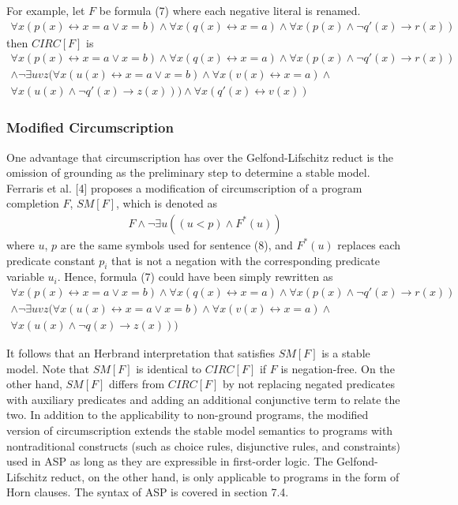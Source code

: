 For example, let $F$ be formula (7) where each negative literal is renamed.
\begin{align*}
    \forall x (p(x) \leftrightarrow x = a \lor x = b) \land 
    \forall x (q(x) \leftrightarrow x = a) \land 
    \forall x (p(x) \land \neg q'(x) \rightarrow r(x))
\end{align*}
then $CIRC[F]$ is 
\begin{multline*}
    \forall x (p(x) \leftrightarrow x = a \lor x = b) \land 
    \forall x (q(x) \leftrightarrow x = a) \land 
    \forall x (p(x) \land \neg q'(x) \rightarrow r(x)) \\ 
    \land \neg \exists uvz (
        \forall x (u(x) \leftrightarrow x = a \lor x = b) \land 
        \forall x (v(x) \leftrightarrow x = a) \land 
        \\ \forall x (u(x) \land \neg q'(x) \rightarrow z(x)) 
    ) 
    \land \forall x (q'(x) \leftrightarrow v(x))
\end{multline*}

\subsubsection{Modified Circumscription}
One advantage that circumscription has over the Gelfond-Lifschitz reduct 
is the omission of grounding as the preliminary step to determine a stable 
model. Ferraris et al. [4] proposes a modification of circumscription of 
a program completion $F$, $SM[F]$, which is denoted as 
\begin{align}
    F \land \neg \exists u((u < p) \land F^*(u)) 
\end{align}
where $u$, $p$ are the same symbols used for sentence (8), and $F^*(u)$ 
replaces each predicate constant $p_i$ that is not a negation with 
the corresponding predicate variable $u_i$. Hence, formula (7) could 
have been simply rewritten as 
\begin{multline*}
    \forall x (p(x) \leftrightarrow x = a \lor x = b) \land 
    \forall x (q(x) \leftrightarrow x = a) \land 
    \forall x (p(x) \land \neg q'(x) \rightarrow r(x)) \\ 
    \land \neg \exists uvz (
        \forall x (u(x) \leftrightarrow x = a \lor x = b) \land 
        \forall x (v(x) \leftrightarrow x = a) \land 
        \\ \forall x (u(x) \land \neg q(x) \rightarrow z(x)) 
    ) 
\end{multline*}

It follows 
that an Herbrand interpretation that satisfies $SM[F]$ is a stable model. 
Note that $SM[F]$ is identical to $CIRC[F]$ if $F$ is negation-free. On the 
other hand, $SM[F]$ differs from $CIRC[F]$ by not replacing  
negated predicates with auxiliary predicates and adding an additional 
conjunctive term to relate the two. In addition to the applicability 
to non-ground programs, the modified version of circumscription 
extends the stable model semantics to programs with nontraditional constructs 
(such as choice rules, disjunctive rules, and constraints) used in ASP as 
long as they are expressible in first-order logic. The Gelfond-Lifschitz reduct, 
on the other hand, is only applicable to programs in the form of Horn clauses.
The syntax of ASP is covered in section 7.4.

